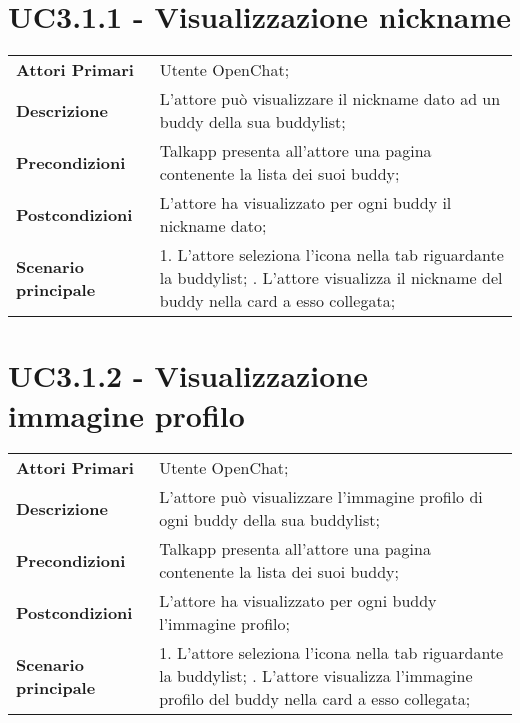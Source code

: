 \section{UC3.1.1 - Visualizzazione nickname}
	\begin{center}
	\bgroup
	\def\arraystretch{1.8}     
	\begin{longtable}{  p{4cm} | p{9.5cm} } 
		\textbf{Attori Primari} & Utente OpenChat; \\ 
		\textbf{Descrizione} &  L'attore può visualizzare il nickname dato ad un buddy della sua buddylist; \\ 
		\textbf{Precondizioni}  & Talkapp presenta all'attore una pagina contenente la lista dei suoi buddy; \\
		\textbf{Postcondizioni} & L'attore ha visualizzato per ogni buddy il nickname dato;  \\ 
		\textbf{Scenario principale} & 
		1. L'attore seleziona l'icona nella tab riguardante la buddylist; \newline
		2. L'attore visualizza il nickname del buddy nella card a esso collegata;
	\end{longtable}
	\egroup
\end{center}
\section{UC3.1.2 - Visualizzazione immagine profilo}
	\begin{center}
	\bgroup
	\def\arraystretch{1.8}     
	\begin{longtable}{  p{4cm} | p{9.5cm} } 
		\textbf{Attori Primari} & Utente OpenChat; \\ 
		\textbf{Descrizione} &  L'attore può visualizzare l'immagine profilo di ogni buddy della sua buddylist; \\ 
		\textbf{Precondizioni}  & Talkapp presenta all'attore una pagina contenente la lista dei suoi buddy; \\
		\textbf{Postcondizioni} & L'attore ha visualizzato per ogni buddy  l'immagine profilo;  \\ 
		\textbf{Scenario principale} & 
		1. L'attore seleziona l'icona nella tab riguardante la buddylist; \newline
		2. L'attore visualizza l'immagine profilo del buddy nella card a esso collegata;
	\end{longtable}
	\egroup
\end{center}

